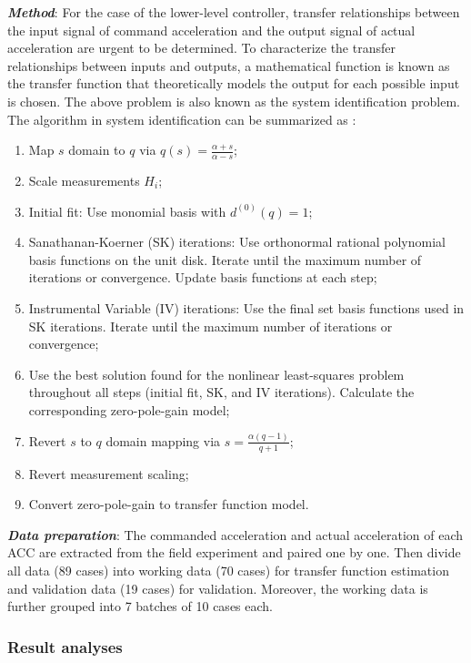 \documentclass[journal]{IEEEtran}
\begin{document}
\textbf{\emph{Method}}: For the case of the lower-level controller, transfer relationships between the input signal of command acceleration and the output signal of actual acceleration are urgent to be determined. To characterize the transfer relationships between inputs and outputs, a mathematical function is known as the transfer function that theoretically models the output for each possible input is chosen. The above problem is also known as the system identification problem. The algorithm in system identification can be summarized as \citep{Ozdemir2017,Kollar2006,Ljung1995}:
\begin{enumerate}
  \item Map $s$ domain to $q$ via $q(s)=\frac{\alpha+s}{\alpha-s}$;
  \item Scale measurements $H_i$;
  \item Initial fit: Use monomial basis with $d^{(0)}(q)=1$;
  \item Sanathanan-Koerner (SK) iterations: Use orthonormal rational polynomial basis functions on the unit disk. Iterate until the maximum number of iterations or convergence. Update basis functions at each step;
  \item Instrumental Variable (IV) iterations: Use the final set basis functions used in SK iterations. Iterate until the maximum number of iterations or convergence;
  \item Use the best solution found for the nonlinear least-squares problem throughout all steps (initial fit, SK, and IV iterations). Calculate the corresponding zero-pole-gain model;
  \item Revert $s$ to $q$ domain mapping via $s=\frac{\alpha(q-1)}{q+1}$;
  \item Revert measurement scaling;
  \item Convert zero-pole-gain to transfer function model.
\end{enumerate}

\textbf{\emph{Data preparation}}: The commanded acceleration and actual acceleration of each ACC are extracted from the field experiment and paired one by one. Then divide all data (89 cases) into working data (70 cases) for transfer function estimation and validation data (19 cases) for validation. Moreover, the working data is further grouped into 7 batches of 10 cases each.



\subsubsection{Result analyses}
\label{Section 3.3.2}
\end{document}
